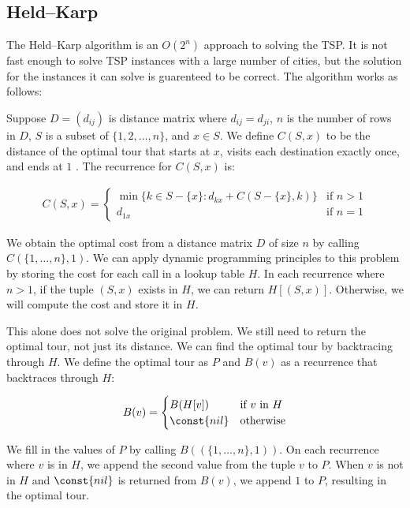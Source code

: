 \documentclass[11pt,fleqn]{article}
\begin{document}
\subsection{Held--Karp}
The Held--Karp algorithm is an $O(2^n)$ approach to solving the TSP\@.
It is not fast enough to solve TSP instances with a large number of
cities, but the solution for the instances it can solve is guarenteed
to be correct.  The algorithm works as follows:
\par

Suppose $D = (d_{ij})$ is distance
matrix where $d_{ij} = d_{ji}$, $n$ is the number of rows in $D$,
$S$ is a subset of $\{1, 2,\dots,n\}$, and $x\in S$.  We define $C(S, x)$
to be the distance of the optimal tour that starts at $x$, visits each
destination exactly once, and ends at $1$ \cite{heldkarp}.  The recurrence
for $C(S,x)$ is:

\begin{align*}
  C(S, x)=\begin{cases}
    \min\{k\in S-\{x\} : d_{kx} + C(S-\{x\}, k) \}  & \text{if } n>1 \\
    d_{1x}                                          & \text{if } n=1
  \end{cases}
\end{align*}

We obtain the optimal cost from a distance matrix $D$ of size $n$ by calling
$C(\{1,\dots,n\}, 1)$.  We can apply dynamic programming principles to this
problem by storing the cost for each call in a lookup table $H$.  In each
recurrence where $n>1$, if the tuple $(S, x)$ exists in $H$, we can return
$H[(S, x)]$.  Otherwise,  we will compute the cost and store it in $H$.
\par

This alone does not solve the original problem.  We still need to return 
the optimal tour, not just its distance.  We can find the optimal tour
by backtracing through $H$.  We define the optimal tour as $P$ and $B(v)$
as a recurrence that backtraces through $H$:

\begin{align*}
  B(v)=\begin{cases}
    B(H[v])     & \text{if } v \text{\ in\ } H \\
    \const{nil} & \text{otherwise} 
  \end{cases}
\end{align*}

We fill in the values of $P$ by calling $B((\{1,\dots,n\}, 1))$.  On each
recurrence where $v$ is in $H$, we append the second value from the tuple $v$
to $P$.  When $v$ is not in $H$ and $\const{nil}$ is returned from $B(v)$, we
append $1$ to $P$, resulting in the optimal tour.
\par
\end{document}
